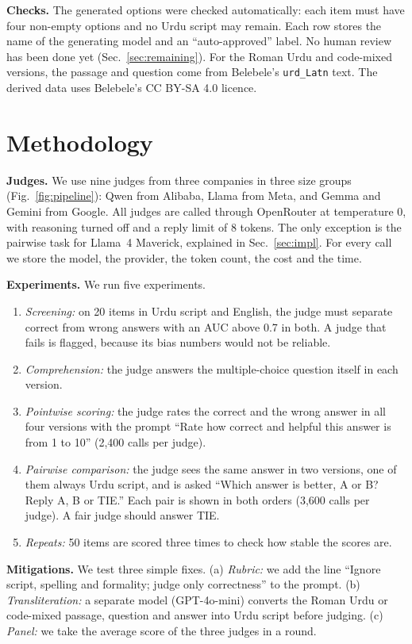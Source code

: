 \documentclass[conference]{IEEEtran}
\begin{document}
\textbf{Checks.} The generated options were checked automatically: each item must have four non-empty options and no
Urdu script may remain. Each row stores the name of the generating model and an ``auto-approved'' label. No human
review has been done yet (Sec.~\ref{sec:remaining}). For the Roman Urdu and code-mixed versions, the passage and
question come from Belebele's \texttt{urd\_Latn} text. The derived data uses Belebele's CC BY-SA 4.0 licence.

\section{Methodology}
\label{sec:method}
\textbf{Judges.} We use nine judges from three companies in three size groups (Fig.~\ref{fig:pipeline}): Qwen from
Alibaba, Llama from Meta, and Gemma and Gemini from Google. All judges are called through OpenRouter at temperature 0,
with reasoning turned off and a reply limit of 8 tokens. The only exception is the pairwise task for Llama~4 Maverick,
explained in Sec.~\ref{sec:impl}. For every call we store the model, the provider, the token count, the cost and the
time.

\textbf{Experiments.} We run five experiments.
\begin{enumerate}
\item \emph{Screening:} on 20 items in Urdu script and English, the judge must separate correct from wrong answers with
an AUC above 0.7 in both. A judge that fails is flagged, because its bias numbers would not be reliable.
\item \emph{Comprehension:} the judge answers the multiple-choice question itself in each version.
\item \emph{Pointwise scoring:} the judge rates the correct and the wrong answer in all four versions with the prompt
``Rate how correct and helpful this answer is from 1 to 10'' (2{,}400 calls per judge).
\item \emph{Pairwise comparison:} the judge sees the same answer in two versions, one of them always Urdu script, and is
asked ``Which answer is better, A or B? Reply A, B or TIE.'' Each pair is shown in both orders (3{,}600 calls per
judge). A fair judge should answer TIE.
\item \emph{Repeats:} 50 items are scored three times to check how stable the scores are.
\end{enumerate}

\textbf{Mitigations.} We test three simple fixes. (a) \emph{Rubric:} we add the line ``Ignore script, spelling and
formality; judge only correctness'' to the prompt. (b) \emph{Transliteration:} a separate model (GPT-4o-mini) converts
the Roman Urdu or code-mixed passage, question and answer into Urdu script before judging. (c) \emph{Panel:} we take
the average score of the three judges in a round.
\end{document}

